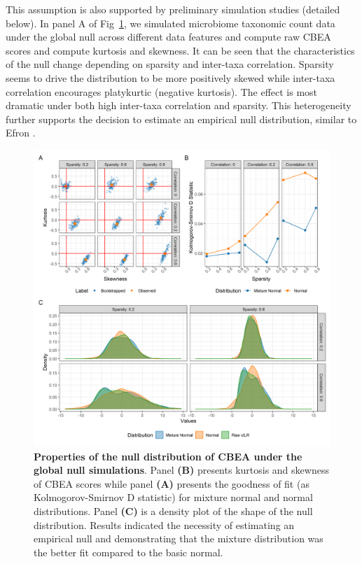\documentclass[10pt,letterpaper]{article}
\begin{document}
This assumption is also supported by preliminary simulation studies (detailed below). In panel A of Fig~\ref{fig:1}, we simulated microbiome taxonomic count data under the global null across different data features and compute raw CBEA scores and compute kurtosis and skewness. It can be seen that the characteristics of the null change depending on sparsity and inter-taxa correlation. Sparsity seems to drive the distribution to be more positively skewed while inter-taxa correlation encourages platykurtic (negative kurtosis). The effect is most dramatic under both high inter-taxa correlation and sparsity. This heterogeneity further supports the decision to estimate an empirical null distribution, similar to Efron \cite{efron2004}. 

\begin{figure} [!h]
    \centering
    \includegraphics[width=\linewidth]{figures/kurtosis_skewness_gof.png}
    \caption{{\bf Properties of the null distribution of CBEA under the global null simulations}. Panel \textbf{(B)} presents kurtosis and skewness of CBEA scores while panel \textbf{(A)} presents the goodness of fit (as Kolmogorov-Smirnov D statistic) for mixture normal and normal distributions. Panel \textbf{(C)} is a density plot of the shape of the null distribution. Results indicated the necessity of estimating an empirical null and demonstrating that the mixture distribution was the better fit compared to the basic normal.}
    \label{fig:1}
\end{figure}
\end{document}
